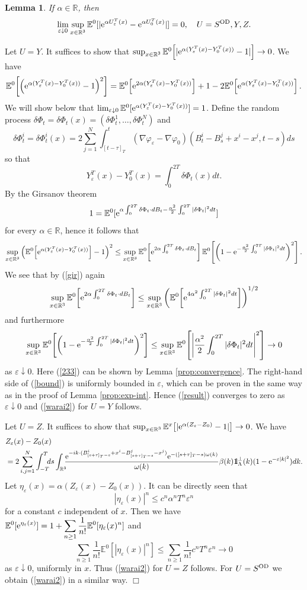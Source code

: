 \documentclass[11pt]{article}
\newtheorem{lemma}[theorem]{Lemma}
\newcommand{\bl}[1]{\begin{lemma}\label{#1}}
\newcommand{\el}{\end{lemma}}
\def\bbbone{{\mathchoice {\rm 1\mskip-4mu l} {\rm 1\mskip-4mu l}
{\rm 1\mskip-4.5mu l} {\rm 1\mskip-5mu l}}}
\def\one{\bbbone}
\newcommand{\kp}{\one_\Lambda^\perp(k)}
\newcommand{\Ebb}{{\mathbb E}}
\providecommand{\eq}[1]{\begin{equation}\label{#1}}
\providecommand{\en}{\end{equation}}
\renewcommand{\d}{\displaystyle}
\providecommand{\qed}{\hfill {$\Box$}\par\medskip}
\providecommand{\BR}{{\mathbb{R}^3 }}
\providecommand{\iijj}{\sum_{i,j=1}^N}
\providecommand{\od}{{\rm OD}}
\providecommand{\RR}{\mathbb{R}}
\providecommand{\kak}[1]{(\ref{#1})}
\providecommand{\lk}{\left(}
\providecommand{\rk}{\right)}
\providecommand{\han}{{1/2}}
\providecommand{\e}{{\rm e}}
\providecommand{\1}{\mathbb{1}}
\providecommand{\eps}{\varepsilon}
\newcounter {constant}
\begin{document}
\bl{convexp2}
If $\alpha\in\RR$, then
\eq{warai2}
\lim_{\eps\downarrow 0}\sup_{x\in\BR} \Ebb^0[|\e^{\alpha U_\eps^T(x)}-\e^{\alpha U_0^T(x)}|]=0,\quad
U=S^{\od}, Y,Z.
\en
\el
\proof
Let $U=Y$. It suffices to show that $\sup_{x\in\BR}\Ebb^0\!\left[|\e^{\alpha (Y_\eps^T(x)-Y_0^T(x))}-1|\right]
\to 0$. We have
\eq{ilo}
\Ebb^0\!\left[\lk \e^{\alpha (Y_\eps^T(x)-Y_0^T(x))}-1\rk^2 \right]=
\Ebb^0\!\left[\e^{2\alpha (Y_\eps^T(x)-Y_0^T(x))}\right]+
1-2\Ebb^0\!\left[\e^{\alpha (Y_\eps^T(x)-Y_0^T(x))}\right].
\en
We will show below that $\lim_{\eps\downarrow 0} \Ebb^0[\e^{\alpha (Y_\eps^T(x)-Y_0^T(x))}]=1$.
Define the random process $\delta \Phi_t=\delta \Phi_t(x)=(\delta\Phi_t^1,\ldots,\delta \Phi_t^N)$ and
$$
\d \delta \Phi_t^i = \delta \Phi_t^i(x)= 2 \sum_{j=1}^N \int^t_{[t-\tau]_T}(\nabla \varphi_\eps-\nabla\varphi_0)
(B_t^i-B_s^j+x^i-x^j,t-s)ds
$$
so that
$$
Y_\eps^T(x)-Y_0^T(x)=\int_{0}^{2T} \delta\Phi_t(x) dt.
$$
By the Girsanov theorem
\eq{gir}
1=\Ebb^0[\e^{\alpha \int_{0}^ {2T} \delta\Phi_t \cdot dB_t -\frac{\alpha^2}{2} \int_{0}^ {2T} |\delta\Phi_t|^2 dt}]
\en
for every $\alpha\in\RR$, hence it follows that
\eq{result}
\sup_{x\in\BR} \lk \Ebb^0\!\left[\e^{\alpha (Y_\eps^T(x)-Y_0^T(x))} \right]-1\rk^2
\leq
\sup_{x\in\BR} \Ebb^0\!\left[\e^{2\alpha\int_{0}^{2T} \delta\Phi_t \cdot dB_t}\right]
\Ebb^0\!\left[\lk1-\e^{-\frac{\alpha^2}{2}\int_{0}^{2T} |\delta\Phi_t|^2 dt}\rk^2\right].
\en
We see that by \kak{gir} again
\eq{bound}
\sup_{x\in\BR}\Ebb^0\!\left[\e^{2\alpha\int_{0}^{2T} \delta\Phi_t \cdot dB_t}\right]
\leq
\sup_{x\in\BR}\lk \Ebb^0\!\left[\e^{4\alpha^2\int_{0}^{2T} |\delta\Phi_t|^2 dt}\right]\rk ^\han
\en
and furthermore
\eq{233}
\sup_{x\in\BR}\Ebb^0\!\left[\lk1-\e^{-\frac{\alpha^2}{2}\int_{0}^{2T} |\delta\Phi_t|^2 dt}\rk^2\right]
\leq
\sup_{x\in\BR}\Ebb^0\!\left[\left|\frac{\alpha^2}{2}\int_{0}^{2T} |\delta\Phi_t|^2dt\right|^2\right]\to 0
\en
as $\eps\downarrow 0$. Here \kak{233}  can be shown by Lemma \ref{prop:convergence}. The right-hand
side of \kak{bound} is uniformly bounded in $\eps$, which can be proven  in the same way as in the
proof of Lemma \ref{prop:exp-int}. Hence \kak{result} converges to zero as $\eps\downarrow 0$ and
\kak{warai2} for $U=Y$ follows.

Let $U=Z$. It suffices to show that $\sup_{x\in\BR}\Ebb^x\!\left[|\e^{\alpha (Z_\eps-Z_0)}-1|\right]\to 0$.
We have
\begin{align*}
&Z_\eps(x)-Z_0(x)\\
&=
2\iijj \int_{-T}^T
\!\!\!
ds\int_\BR\!\!\!
\frac{\e^{-ik\cdot(B_{[s+\tau]_T-s}^i+x^i-B_{[s+\tau]_T-s}^j-x^j)}\e^{-([s+\tau]_T-s)\omega(k)} }{\omega(k)}
\beta(k)\kp (1-\e^{-\eps|k|^2})dk.
\end{align*}
Let $\eta_\eps(x)=\alpha (Z_\eps(x)-Z_0(x))$. 
It can be directly seen that
$$
|\eta_\eps(x)|^n\leq c^n \alpha^n T^n \eps^n
$$
for a constant $c$ independent of $x$. Then we have $\d \Ebb^0[\e^{\eta_\eps(x)}]=
1+\sum_{n\geq 1}\frac{1}{n!} \Ebb^0[\eta_\eps(x)^n]$ and
$$
\d \sum_{n\geq 1}\frac{1}{n!}  \Ebb^0[|\eta_\eps(x)|^n] \leq \sum_{n\geq 1}\frac{1}{n!}c^n T^n \eps^n\to 0
$$
as $\eps\downarrow 0$, uniformly in $x$. Thus \kak{warai2} for $U=Z$ follows. For $U=S^{\od}$ we obtain
\kak{warai2} in a similar way.
\qed
\end{document}
